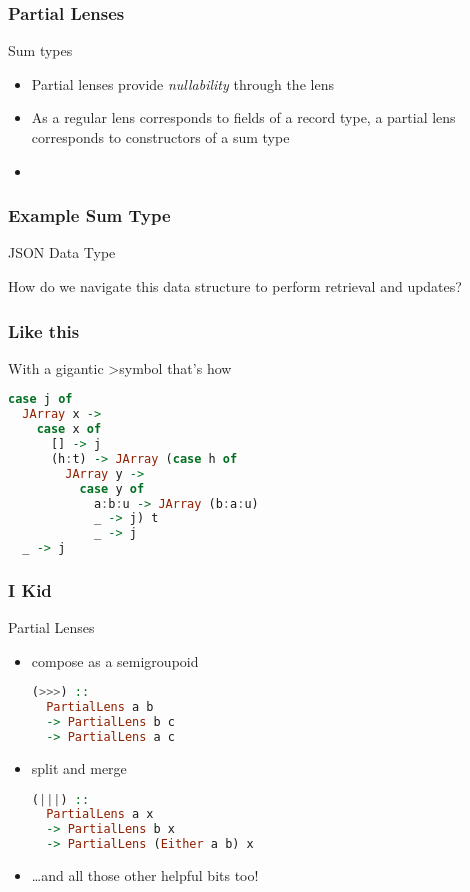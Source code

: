 \begin{frame}
\frametitle{Partial Lenses}

\begin{block}{Sum types}
\begin{itemize}
\item Partial lenses provide \emph{nullability} through the lens
\item As a regular lens corresponds to fields of a record type, a partial lens corresponds to constructors of a sum type
\item 
\end{itemize}
\end{block}

\end{frame}

\begin{frame}
\frametitle{Example Sum Type}

\begin{block}{JSON Data Type}

How do we navigate this data structure to perform retrieval and updates?
\end{block}

\end{frame}

\begin{frame}[fragile]
\frametitle{Like this}

\begin{block}{With a gigantic \textgreater symbol that's how}
\begin{lstlisting}[language=haskell]
case j of
  JArray x -> 
    case x of
      [] -> j
      (h:t) -> JArray (case h of 
        JArray y ->
          case y of
            a:b:u -> JArray (b:a:u)
            _ -> j) t
            _ -> j
  _ -> j
\end{lstlisting}
\end{block}

\end{frame}

\begin{frame}[fragile]
\frametitle{I Kid}

\begin{block}{Partial Lenses}
\begin{itemize}
\item compose as a semigroupoid
\begin{lstlisting}[language=haskell]
(>>>) ::
  PartialLens a b
  -> PartialLens b c
  -> PartialLens a c
\end{lstlisting}
\item split and merge
\begin{lstlisting}[language=haskell]
(|||) ::
  PartialLens a x
  -> PartialLens b x
  -> PartialLens (Either a b) x
\end{lstlisting}
\item \ldots and all those other helpful bits too!
\end{itemize}
\end{block}

\end{frame}

